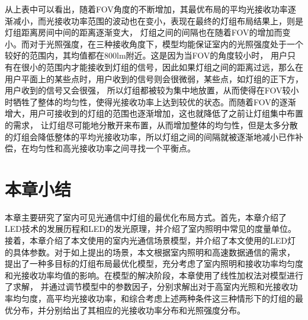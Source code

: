 从上表中可以看出，随着FOV角度的不断增加，其最优布局的平均光接收功率逐渐减小，而光接收功率范围的波动也在变小，表现在最终的灯组布局结果上，则是灯组距离房间中间的距离逐渐变大，
灯组之间的间隔也在随着FOV的增加而变小。而对于光照强度，在三种接收角度下，模型均能保证室内的光照强度处于一个较好的范围内，其均值都在800lm附近。这是因为当FOV的角度较小时，
用户只有在很小的范围内才能接收到灯组的信号，因此如果灯组之间的距离过远，那么在用户平面上的某些点时，用户收到的信号则会很微弱，某些点，如灯组的正下方，用户收到的信号又会很强，
所以灯组都被较为集中地放置，从而使得在FOV较小时牺牲了整体的均匀性，使得光接收功率上达到较优的状态。而随着FOV的逐渐增大，用户可接收到的灯组的范围也逐渐增加，这也就降低了之前让灯组集中布置的需求，
让灯组尽可能地分散开来布置，从而增加整体的均匀性，但是太多分散的灯组会降低整体的平均光接收功率，所以灯组之间的间隔就被逐渐地减小已作补偿，在均匀性和高光接收功率之间寻找一个平衡点。


\section{本章小结}
本章主要研究了室内可见光通信中灯组的最优化布局方式。首先，本章介绍了LED技术的发展历程和LED的发光原理，并介绍了室内照明中常见的度量单位。
接着，本章介绍了本文使用的室内光通信场景模型，并介绍了本文使用的LED灯的具体参数。对于如上提出的场景，本文根据室内照明和高速数据通信的需求，
提出了一种多目标的灯组布局最优化模型，充分考虑了室内照明和接收功率均匀度和光接收功率均值的影响。在模型的解决阶段，本章使用了线性加权法对模型进行了求解，
并通过调节模型中的参数因子，分别求解出对于高室内光照和光接收功率均匀度，高平均光接收功率，和综合考虑上述两种条件这三种情形下的灯组的最优分布，并分别给出了其相应的光接收功率分布和光照强度分布。
